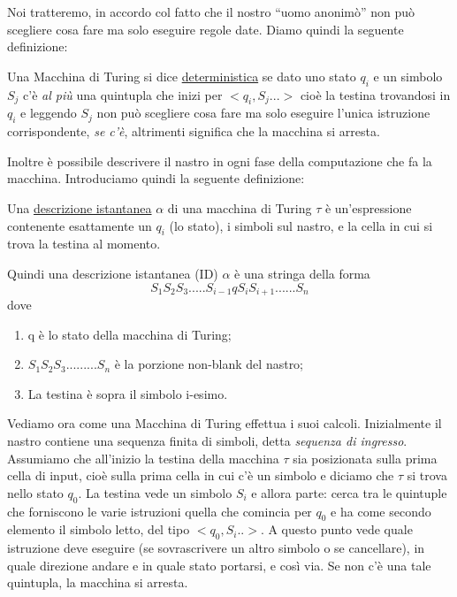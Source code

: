 Noi tratteremo, in accordo col fatto che il nostro ``uomo anonim\`o''
non pu\`o scegliere cosa fare ma solo eseguire regole date. Diamo
quindi la seguente definizione:

\begin{defi}
Una Macchina di Turing si dice \underline{deterministica} se dato uno
stato $q_{i}$ e un simbolo $S_{j}$ c'\`e \textsl{al pi\`u} una
quintupla che inizi per $<q_{i},S_{j}...>$ cio\`e la testina
trovandosi in $q_{i}$ e leggendo $S_{j}$ non pu\`o scegliere cosa fare
ma solo eseguire l'unica istruzione corrispondente, \textsl{se c'\`e},
altrimenti significa che la macchina si arresta.
\end{defi}

Inoltre \`e possibile descrivere il nastro in ogni fase della
computazione che fa la macchina. Introduciamo quindi la seguente
definizione:

\begin{defi}
Una \underline{descrizione istantanea} $\alpha$ di una macchina di
Turing $\tau$ \`e un'espressione contenente esattamente un $q_{i}$ (lo
stato), i simboli sul nastro, e la cella in cui si trova la testina al
momento.
\end{defi}

Quindi una descrizione istantanea (ID) $\alpha$ \`e una stringa della
forma $$S_1S_2S_3.....S_{i-1}qS_{i}S_{i+1}......S_{n}$$ dove

\begin{enumerate}
\item q \`e lo stato della macchina di Turing;
\item $S_1S_2S_3.........S_{n}$ \`e la porzione non-blank del nastro;
\item La testina \`e sopra il simbolo i-esimo.
\end{enumerate}
\vspace{0.5cm}

Vediamo ora come una Macchina di Turing effettua i suoi
calcoli. Inizialmente il nastro contiene una sequenza finita di
simboli, detta \textsl{sequenza di ingresso}. Assumiamo che all'inizio
la testina della macchina $\tau$ sia posizionata sulla prima cella di
input, cio\`e sulla prima cella in cui c'\`e un simbolo e diciamo che
$\tau$ si trova nello stato $q_0$. La testina vede un simbolo $S_i$ e
allora parte: cerca tra le quintuple che forniscono le varie
istruzioni quella che comincia per $q_0$ e ha come secondo elemento il
simbolo letto, del tipo $<q_0,S_i..>$. A questo punto vede quale
istruzione deve eseguire (se sovrascrivere un altro simbolo o se
cancellare), in quale direzione andare e in quale stato portarsi, e
cos\`i via. Se non c'\`e una tale quintupla, la macchina si arresta.

